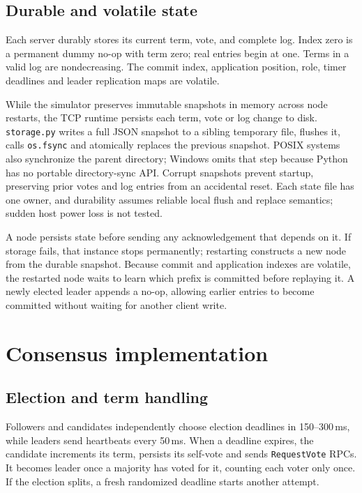 \documentclass[10pt,a4paper]{article}
\newcommand{\rpc}[1]{\mbox{\texttt{#1}}}
\begin{document}
\subsection{Durable and volatile state}
Each server durably stores its current term, vote, and complete log. Index zero
is a permanent dummy no-op with term zero; real entries begin at one. Terms in a
valid log are nondecreasing. The commit index, application position, role, timer
deadlines and leader replication maps are volatile.

While the simulator preserves immutable snapshots in memory across node
restarts, the TCP runtime persists each term, vote or log change to disk.
\texttt{storage.py} writes a full JSON snapshot to a sibling temporary file,
flushes it, calls \texttt{os.fsync} and atomically replaces the previous snapshot.
POSIX systems also synchronize the parent directory; Windows omits that step
because Python has no portable directory-sync API. Corrupt snapshots prevent
startup, preserving prior votes and log entries from an accidental reset.
Each state file has one owner, and durability assumes reliable local flush and
replace semantics; sudden host power loss is not tested.

A node persists state before sending any acknowledgement that depends on it.
If storage fails, that instance stops permanently; restarting constructs a new
node from the durable snapshot. Because commit and application indexes are
volatile, the restarted node waits to learn which prefix is committed before
replaying it. A newly elected leader appends a no-op, allowing earlier entries
to become committed without waiting for another client write.

\section{Consensus implementation}
\subsection{Election and term handling}
Followers and candidates independently choose election deadlines in
150--300\,ms, while leaders send heartbeats every 50\,ms. When a deadline expires,
the candidate increments its term, persists its self-vote and sends
\rpc{RequestVote} RPCs. It becomes leader once a majority has voted for it, counting each
voter only once. If the election splits, a fresh randomized deadline starts
another attempt.
\end{document}
